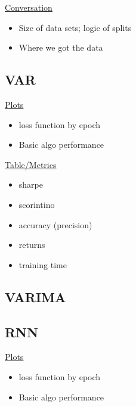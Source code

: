 \documentclass{article}
\begin{document}
\underline{Conversation}
\begin{itemize}
\item Size of data sets; logic of splits
\item Where we got the data
\end{itemize}

\subsection{VAR}

\underline{Plots}
\begin{itemize}
\item loss function by epoch
\item Basic algo performance 
\end{itemize}

\underline{Table/Metrics}
\begin{itemize}
\item sharpe
\item scorintino
\item accuracy (precision)
\item returns
\item training time
\end{itemize}

\subsection{VARIMA}




\subsection{RNN}

\underline{Plots}
\begin{itemize}
\item loss function by epoch
\item Basic algo performance 
\end{itemize}
\end{document}
